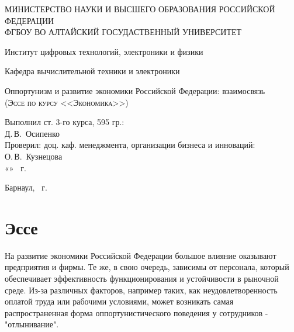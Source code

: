 \documentclass[a4paper, 12pt]{article}
\begin{document}
\begin{titlepage}
  \begin{center}
    \MakeUppercase{Министерство науки и высшего образования Российской Федерации} \\
    \MakeUppercase{ФГБОУ ВО Алтайский госудаственный университет}
    \vspace{0.25cm}
    
	  Институт цифровых технологий, электроники и физики
    
    Кафедра вычислительной техники и электроники
    \vfill
    
    {\LARGE Оппортунизм и развитие экономики Российской Федерации: взаимосвязь}\\[5mm]
    \textsc{(Эссе по курсу <<Экономика>>)}
  \bigskip

\end{center}
\vfill

\newlength{\ML}
\hfill
\begin{minipage}{0.45\textwidth}
  Выполнил ст. 3-го курса, 595 гр.:\\
  \underline{\hspace{\ML}} Д.\,В.~Осипенко\\
  Проверил: доц. каф. менеджмента, организации бизнеса и инноваций:\\
  \underline{\hspace{\ML}} О.\,В.~Кузнецова\\
  «\underline{\hspace{0.7cm}}» \underline{\hspace{2cm}} \the\year~г.
\end{minipage}%
\vfill

\begin{center}
  Барнаул, \the\year~г.
\end{center}
\end{titlepage}
\tableofcontents
\newpage

\section{Эссе}
На развитие экономики Российской Федерации большое влияние оказывают предприятия и фирмы.
Те же, в свою очередь, зависимы от персонала, который обеспечивает эффективность функционирования и устойчивости в рыночной среде.
Из-за различных факторов, например таких, как неудовлетворенность оплатой труда или рабочими условиями, может возникать самая распространенная форма оппортунистического поведения у сотрудников - "отлынивание".
\end{document}
